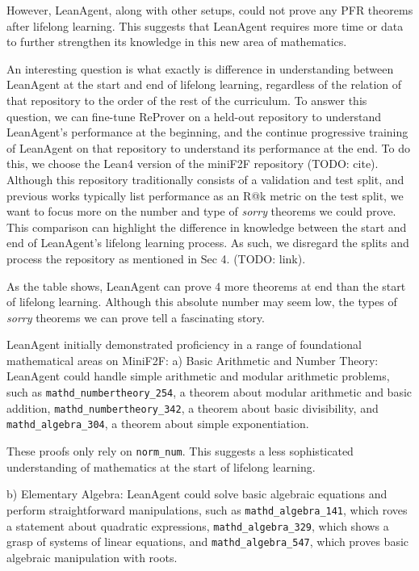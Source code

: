 \documentclass{article} %
\begin{document}
However, LeanAgent, along with other setups, could not prove any PFR theorems after lifelong learning. This suggests that LeanAgent requires more time or data to further strengthen its knowledge in this new area of mathematics.

An interesting question is what exactly is difference in understanding between LeanAgent at the start and end of lifelong learning, regardless of the relation of that repository to the order of the rest of the curriculum. To answer this question, we can fine-tune ReProver on a held-out repository to understand LeanAgent's performance at the beginning, and the continue progressive training of LeanAgent on that repository to understand its performance at the end. To do this, we choose the Lean4 version of the miniF2F repository (TODO: cite). Although this repository traditionally consists of a validation and test split, and previous works typically list performance as an R@k metric on the test split, we want to focus more on the number and type of \textit{sorry} theorems we could prove. This comparison can highlight the difference in knowledge between the start and end of LeanAgent's lifelong learning process. As such, we disregard the splits and process the repository as mentioned in Sec 4. (TODO: link).

As the table shows, LeanAgent can prove 4 more theorems at end than the start of lifelong learning. Although this absolute number may seem low, the types of \textit{sorry} theorems we can prove tell a fascinating story.

LeanAgent initially demonstrated proficiency in a range of foundational mathematical areas on MiniF2F:
a) Basic Arithmetic and Number Theory:
LeanAgent could handle simple arithmetic and modular arithmetic problems, such as \texttt{mathd\_numbertheory\_254}, a theorem about modular arithmetic and basic addition, \texttt{mathd\_numbertheory\_342}, a theorem about basic divisibility, and \texttt{mathd\_algebra\_304}, a theorem about simple exponentiation.

These proofs only rely on \texttt{norm\_num}. This suggests a less sophisticated understanding of mathematics at the start of lifelong learning.

b) Elementary Algebra:
LeanAgent could solve basic algebraic equations and perform straightforward manipulations, such as \texttt{mathd\_algebra\_141}, which roves a statement about quadratic expressions, \texttt{mathd\_algebra\_329}, which shows a grasp of systems of linear equations, and \texttt{mathd\_algebra\_547}, which proves basic algebraic manipulation with roots.
\end{document}
